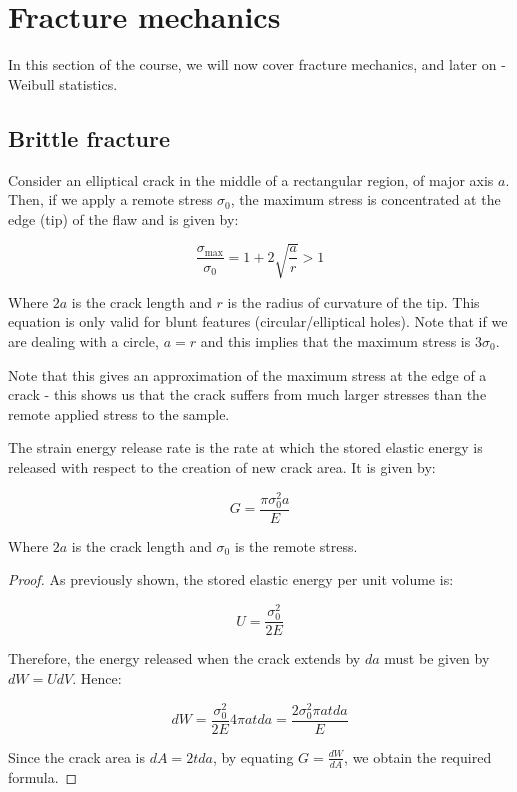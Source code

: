 \documentclass{article}
\begin{document}
\newpage

\section{Fracture mechanics}

In this section of the course, we will now cover fracture mechanics, and later on - Weibull statistics.

\subsection{Brittle fracture}

\begin{proposition}
    Consider an elliptical crack in the middle of a rectangular region, of major axis $a$. Then, if we apply a remote stress $\sigma_0$, the maximum stress is concentrated at the edge (tip) of the flaw and is given by:

    \[ \frac{\sigma_{\text{max}}}{\sigma_0} = 1 + 2\sqrt{\frac{a}{r}} > 1 \]

    Where $2a$ is the crack length and $r$ is the radius of curvature of the tip. This equation is only valid for blunt features (circular/elliptical holes). Note that if we are dealing with a circle, $a = r$ and this implies that the maximum stress is $3\sigma_0$.

    Note that this gives an approximation of the maximum stress at the edge of a crack - this shows us that the crack suffers from much larger stresses than the remote applied stress to the sample.
\end{proposition}

\begin{proposition}
    The strain energy release rate is the rate at which the stored elastic energy is released with respect to the creation of new crack area. It is given by:

    \[ G = \frac{\pi\sigma_0^2a}{E} \]

    Where $2a$ is the crack length  and $\sigma_0$ is the remote stress.
\end{proposition}

\begin{proof}
    As previously shown, the stored elastic energy per unit volume is:

    \[ U = \frac{\sigma_0^2}{2E} \]

    Therefore, the energy released when the crack extends by $da$ must be given by $dW = UdV$. Hence:

    \[ dW = \frac{\sigma_0^2}{2E} 4\pi a t da = \frac{2\sigma_0^2 \pi a t da}{E} \]

    Since the crack area is $dA = 2t da$, by equating $G = \frac{dW}{dA}$, we obtain the required formula.
\end{proof}
\end{document}
